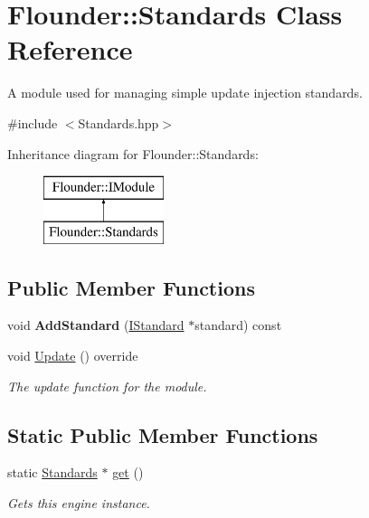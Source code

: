\hypertarget{class_flounder_1_1_standards}{}\section{Flounder\+:\+:Standards Class Reference}
\label{class_flounder_1_1_standards}


A module used for managing simple update injection standards.  




{\ttfamily \#include $<$Standards.\+hpp$>$}

Inheritance diagram for Flounder\+:\+:Standards\+:\begin{figure}[H]
\begin{center}
\leavevmode
\includegraphics[height=2.000000cm]{class_flounder_1_1_standards}
\end{center}
\end{figure}
\subsection*{Public Member Functions}
\begin{DoxyCompactItemize}
\item 
\mbox{\label{class_flounder_1_1_standards_a1b608ad781a7375e2b728a7943669ffb}} 
void {\bfseries Add\+Standard} (\hyperlink{class_flounder_1_1_i_standard}{I\+Standard} $\ast$standard) const
\item 
void \hyperlink{class_flounder_1_1_standards_afe821394da2f3d4a92ff9dc2dbf75b1e}{Update} () override
\begin{DoxyCompactList}\small\item\em The update function for the module. \end{DoxyCompactList}\end{DoxyCompactItemize}
\subsection*{Static Public Member Functions}
\begin{DoxyCompactItemize}
\item 
static \hyperlink{class_flounder_1_1_standards}{Standards} $\ast$ \hyperlink{class_flounder_1_1_standards_af9b0dddb6bff751d794ae5d6dde9687d}{get} ()
\begin{DoxyCompactList}\small\item\em Gets this engine instance. \end{DoxyCompactList}\end{DoxyCompactItemize}
